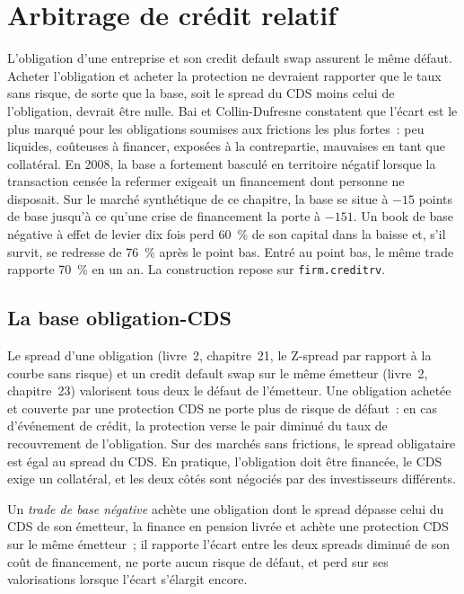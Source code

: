 \chapter{Arbitrage de crédit relatif}\label{ch:s2:credit-relative-value}

L'obligation d'une entreprise et son credit default swap assurent le même défaut. Acheter l'obligation et acheter la protection ne devraient rapporter que le
taux sans risque, de sorte que la base, soit le spread du CDS moins celui de l'obligation, devrait être nulle. Bai et Collin-Dufresne constatent que l'écart est le plus marqué pour les obligations soumises aux
frictions les plus fortes~: peu liquides, coûteuses à financer, exposées à la contrepartie, mauvaises en tant que collatéral. En 2008, la base a fortement basculé en territoire négatif lorsque la transaction
censée la refermer exigeait un financement dont personne ne disposait. Sur le marché synthétique de ce chapitre, la base se situe à $-15$ points de base jusqu'à ce qu'une crise de financement
la porte à $-151$. Un book de base négative à effet de levier dix fois perd 60~\% de son capital dans la baisse et, s'il survit, se redresse de 76~\% après le point bas.
Entré au point bas, le même trade rapporte 70~\% en un an. La construction repose sur \texttt{firm.creditrv}.

\section{La base obligation-CDS}

Le spread d'une obligation (livre~2, chapitre~21, le Z-spread par rapport à la courbe sans risque) et un credit default swap sur le même émetteur (livre~2, chapitre~23) valorisent tous deux
le défaut de l'émetteur. Une obligation achetée et couverte par une protection CDS ne porte plus de risque de défaut~: en cas d'événement de crédit, la protection verse le pair diminué
du taux de recouvrement de l'obligation. Sur des marchés sans frictions, le spread obligataire est égal au spread du CDS. En pratique, l'obligation doit être financée, le CDS exige un collatéral, et les
deux côtés sont négociés par des investisseurs différents.

\begin{definition}\label{def:s2:credit-relative-value:negbasis}
Un \emph{trade de base négative} achète une obligation dont le spread dépasse celui du CDS de son émetteur, la finance en pension livrée et achète
une protection CDS sur le même émetteur~; il rapporte l'écart entre les deux spreads diminué de son coût de financement, ne porte aucun risque de défaut, et perd sur ses valorisations lorsque l'écart
s'élargit encore.
\end{definition}

